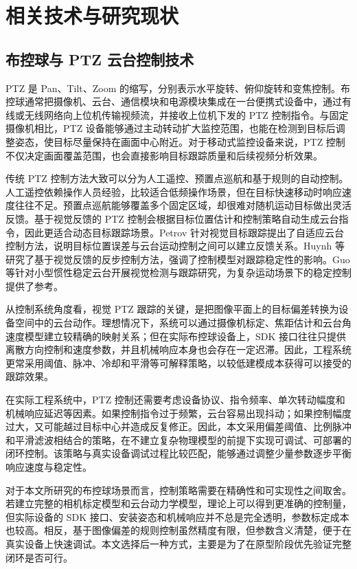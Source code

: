 \chapter{相关技术与研究现状}

\section{布控球与 PTZ 云台控制技术}

PTZ 是 Pan、Tilt、Zoom 的缩写，分别表示水平旋转、俯仰旋转和变焦控制。布控球通常把摄像机、云台、通信模块和电源模块集成在一台便携式设备中，通过有线或无线网络向上位机传输视频流，并接收上位机下发的 PTZ 控制指令。与固定摄像机相比，PTZ 设备能够通过主动转动扩大监控范围，也能在检测到目标后调整姿态，使目标尽量保持在画面中心附近。对于移动式监控设备来说，PTZ 控制不仅决定画面覆盖范围，也会直接影响目标跟踪质量和后续视频分析效果。

传统 PTZ 控制方法大致可以分为人工遥控、预置点巡航和基于规则的自动控制。人工遥控依赖操作人员经验，比较适合低频操作场景，但在目标快速移动时响应速度往往不足。预置点巡航能够覆盖多个固定区域，却很难对随机运动目标做出灵活反馈。基于视觉反馈的 PTZ 控制会根据目标位置估计和控制策略自动生成云台指令，因此更适合动态目标跟踪场景。Petrov 针对视觉目标跟踪提出了自适应云台控制方法，说明目标位置误差与云台运动控制之间可以建立反馈关系\cite{petrov_adaptive_ptz}。Huynh 等研究了基于视觉反馈的反步控制方法，强调了控制模型对跟踪稳定性的影响\cite{huynh_vision_backstepping_2021}。Guo 等针对小型惯性稳定云台开展视觉检测与跟踪研究，为复杂运动场景下的稳定控制提供了参考\cite{guo_vision_based_2021}。

从控制系统角度看，视觉 PTZ 跟踪的关键，是把图像平面上的目标偏差转换为设备空间中的云台动作。理想情况下，系统可以通过摄像机标定、焦距估计和云台角速度模型建立较精确的映射关系；但在实际布控球设备上，SDK 接口往往只提供离散方向控制和速度参数，并且机械响应本身也会存在一定迟滞。因此，工程系统更常采用阈值、脉冲、冷却和平滑等可解释策略，以较低建模成本获得可以接受的跟踪效果。

在实际工程系统中，PTZ 控制还需要考虑设备协议、指令频率、单次转动幅度和机械响应延迟等因素。如果控制指令过于频繁，云台容易出现抖动；如果控制幅度过大，又可能越过目标中心并造成反复修正。因此，本文采用偏差阈值、比例脉冲和平滑滤波相结合的策略，在不建立复杂物理模型的前提下实现可调试、可部署的闭环控制。该策略与真实设备调试过程比较匹配，能够通过调整少量参数逐步平衡响应速度与稳定性。

对于本文所研究的布控球场景而言，控制策略需要在精确性和可实现性之间取舍。若建立完整的相机标定模型和云台动力学模型，理论上可以得到更准确的控制量，但实际设备的 SDK 接口、安装姿态和机械响应并不总是完全透明，参数标定成本也较高。相反，基于图像偏差的规则控制虽然精度有限，但参数含义清楚，便于在真实设备上快速调试。本文选择后一种方式，主要是为了在原型阶段优先验证完整闭环是否可行。

